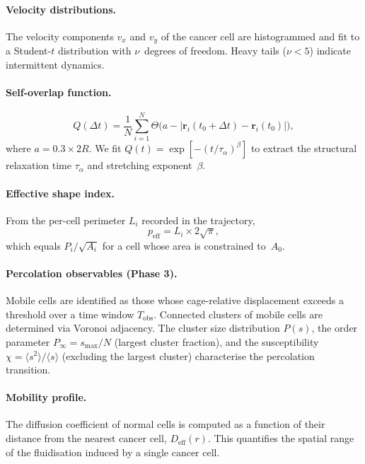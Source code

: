 \documentclass[aps,pre,twocolumn,superscriptaddress,longbibliography,floatfix]{revtex4-2}
\newcommand{\peff}{p_{\mathrm{eff}}}       %
\newcommand{\Deff}{D_{\mathrm{eff}}}       %
\begin{document}
\paragraph{Velocity distributions.}
The velocity components $v_x$ and $v_y$ of the cancer cell are
histogrammed and fit to a Student-$t$ distribution with
$\nu$~degrees of freedom.  Heavy tails ($\nu < 5$) indicate
intermittent dynamics.

\paragraph{Self-overlap function.}
\begin{equation}
  Q(\Delta t) = \frac{1}{N}\sum_{i=1}^{N}
  \Theta\!\bigl(a - |\bm{r}_i(t_0 + \Delta t) - \bm{r}_i(t_0)|\bigr),
  \label{eq:Qt}
\end{equation}
where $a = 0.3 \times 2R$.  We fit $Q(t) = \exp[-(t/\tau_\alpha)^\beta]$
to extract the structural relaxation time $\tau_\alpha$ and stretching
exponent~$\beta$.

\paragraph{Effective shape index.}
From the per-cell perimeter $L_i$ recorded in the trajectory,
\begin{equation}
  \peff = L_i \times 2\sqrt{\pi},
  \label{eq:peff}
\end{equation}
which equals $P_i / \sqrt{A_i}$ for a cell whose area is constrained
to~$A_0$.

\paragraph{Percolation observables (Phase 3).}
Mobile cells are identified as those whose cage-relative displacement
exceeds a threshold over a time window $T_{\mathrm{obs}}$.  Connected
clusters of mobile cells are determined via Voronoi adjacency.  The
cluster size distribution $P(s)$, the order parameter
$P_\infty = s_{\mathrm{max}} / N$ (largest cluster fraction), and the
susceptibility $\chi = \langle s^2\rangle / \langle s\rangle$
(excluding the largest cluster) characterise the percolation
transition.

\paragraph{Mobility profile.}
The diffusion coefficient of normal cells is computed as a function
of their distance from the nearest cancer cell, $\Deff(r)$.  This
quantifies the spatial range of the fluidisation induced by a single
cancer cell.
\end{document}
